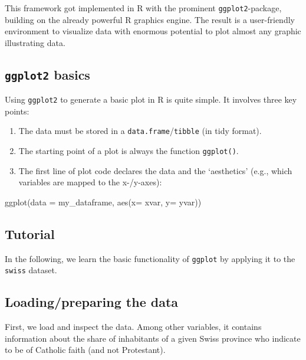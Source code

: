 \documentclass[
  12pt,
]{style/krantz}
\newenvironment{Shaded}{\begin{snugshade}}{\end{snugshade}}
\newcommand{\AttributeTok}[1]{\textcolor[rgb]{0.77,0.63,0.00}{#1}}
\newcommand{\FunctionTok}[1]{\textcolor[rgb]{0.00,0.00,0.00}{#1}}
\newcommand{\NormalTok}[1]{#1}
\providecommand{\tightlist}{%
  \setlength{\itemsep}{0pt}\setlength{\parskip}{0pt}}
\begin{document}
This framework got implemented in R with the prominent \texttt{ggplot2}-package, building on the already powerful R graphics engine. The result is a user-friendly environment to visualize data with enormous potential to plot almost any graphic illustrating data.

\hypertarget{ggplot2-basics}{%
\subsection{\texorpdfstring{\texttt{ggplot2} basics}{ggplot2 basics}}\label{ggplot2-basics}}

Using \texttt{ggplot2} to generate a basic plot in R is quite simple. It involves three key points:

\begin{enumerate}
\def\labelenumi{\arabic{enumi}.}
\tightlist
\item
  The data must be stored in a \texttt{data.frame}/\texttt{tibble} (in tidy format).
\item
  The starting point of a plot is always the function \texttt{ggplot()}.
\item
  The first line of plot code declares the data and the `aesthetics' (e.g., which variables are mapped to the x-/y-axes):
\end{enumerate}

\begin{Shaded}
\begin{Highlighting}[]
\FunctionTok{ggplot}\NormalTok{(}\AttributeTok{data =}\NormalTok{ my\_dataframe, }\FunctionTok{aes}\NormalTok{(}\AttributeTok{x=}\NormalTok{ xvar, }\AttributeTok{y=}\NormalTok{ yvar))}
\end{Highlighting}
\end{Shaded}

\hypertarget{tutorial}{%
\subsection{Tutorial}\label{tutorial}}

In the following, we learn the basic functionality of \texttt{ggplot} by applying it to the \texttt{swiss} dataset.

\hypertarget{loadingpreparing-the-data}{%
\subsection{Loading/preparing the data}\label{loadingpreparing-the-data}}

First, we load and inspect the data. Among other variables, it contains information about the share of inhabitants of a given Swiss province who indicate to be of Catholic faith (and not Protestant).
\end{document}
